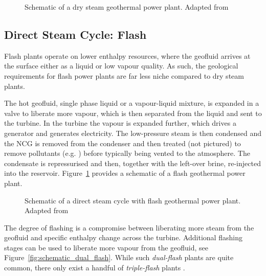         \begin{figure}[H]
            \centering
            
            \caption[Schematic of a dry steam geothermal power plant.]{Schematic of a dry steam geothermal power plant. Adapted from \cite{DiPippo2016}}
            \label{fig:schematic_dry_steam}
        \end{figure}
    
    \subsection{Direct Steam Cycle: Flash}
    \label{sec:flash}

        Flash plants operate on lower enthalpy resources, where the geofluid arrives at the surface either as a liquid or low vapour quality. As such, the geological requirements for flash power plants are far less niche compared to dry steam plants.

        The hot geofluid, single phase liquid or a vapour-liquid mixture, is expanded in a valve to liberate more vapour, which is then separated from the liquid and sent to the turbine. In the turbine the vapour is expanded further, which drives a generator and generates electricity. The low-pressure steam is then condensed and the \ac{NCG} is removed from the condenser and then treated (not pictured) to remove pollutants (e.g. ) before typically being vented to the atmosphere. The condensate is repressurised and then, together with the left-over brine, re-injected into the reservoir. Figure~\ref{fig:schematic_dry_steam} provides a schematic of a flash geothermal power plant.
    
        \begin{figure}[H]
            \centering
            
            \caption[Schematic of a direct steam cycle with flash geothermal power plant.]{Schematic of a direct steam cycle with flash geothermal power plant. Adapted from \cite{DiPippo2016}}
            \label{fig:schematic_flash}
        \end{figure}

        The degree of flashing is a compromise between liberating more steam from the geofluid and specific enthalpy change across the turbine. Additional flashing stages can be used to liberate more vapour from the geofluid, see Figure~\ref{fig:schematic_dual_flash}. While such \emph{dual-flash} plants are quite common, there only exist a handful of \emph{triple-flash} plants \cite{DiPippo2016}.

